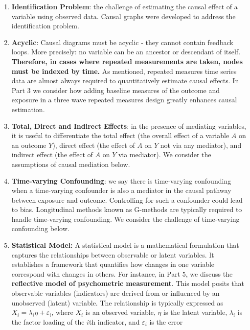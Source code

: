\documentclass[
  singlecolumn]{report}
\begin{document}
\begin{enumerate}
\def\labelenumi{\arabic{enumi}.}
\setcounter{enumi}{11}
\item
  \textbf{Identification Problem}: the challenge of estimating the
  causal effect of a variable using observed data. Causal graphs were
  developed to address the identification problem.
\item
  \textbf{Acyclic}: Causal diagrams must be acyclic - they cannot
  contain feedback loops. More precisely: no variable can be an ancestor
  or descendant of itself. \textbf{Therefore, in cases where repeated
  measurements are taken, nodes must be indexed by time.} As mentioned,
  repeated measures time series data are almost always required to
  quantitatively estimate causal effects. In Part 3 we consider how
  adding baseline measures of the outcome and exposure in a three wave
  repeated measures design greatly enhances causal estimation.
\item
  \textbf{Total, Direct and Indirect Effects}: in the presence of
  mediating variables, it is useful to differentiate the total effect
  (the overall effect of a variable \(A\) on an outcome \(Y\)), direct
  effect (the effect of \(A\) on \(Y\) not via any mediator), and
  indirect effect (the effect of \(A\) on \(Y\) via mediator). We
  consider the assumptions of causal mediation below.
\item
  \textbf{Time-varying Confounding}: we say there is time-varying
  confounding when a time-varying confounder is also a mediator in the
  causal pathway between exposure and outcome. Controlling for such a
  confounder could lead to bias. Longitudinal methods known as G-methods
  are typically required to handle time-varying confounding. We consider
  the challenge of time-varying confounding below.
\item
  \textbf{Statistical Model:} A statistical model is a mathematical
  formulation that captures the relationships between observable or
  latent variables. It establishes a framework that quantifies how
  changes in one variable correspond with changes in others. For
  instance, in Part 5, we discuss the \textbf{reflective model of
  psychometric measurement}. This model posits that observable variables
  (indicators) are derived from or influenced by an unobserved (latent)
  variable. The relationship is typically expressed as
  \(X_i = \lambda_i \eta + \varepsilon_i\), where \(X_i\) is an observed
  variable, \(\eta\) is the latent variable, \(\lambda_i\) is the factor
  loading of the \(i\)th indicator, and \(\varepsilon_i\) is the error

\end{enumerate}
\end{document}
